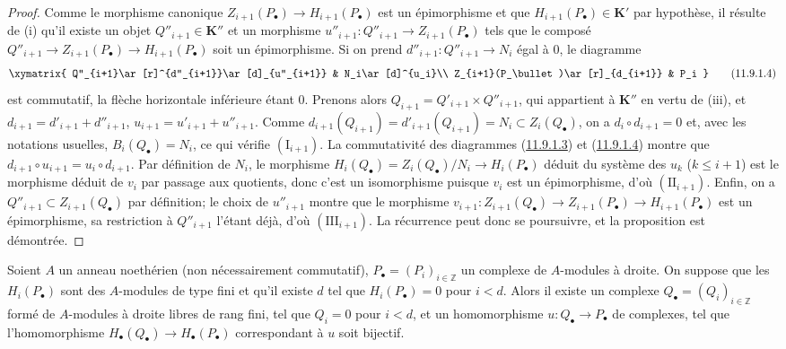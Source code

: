 \begin{proof}
Comme le morphisme canonique $Z_{i+1}(P_\bullet)\to H_{i+1}(P_\bullet)$ est
un épimorphisme et que $H_{i+1}(P_\bullet)\in\boldsymbol{K}'$ par hypothèse, il résulte
de (i) qu'il existe un objet $Q''_{i+1}\in\boldsymbol{K}''$ et un morphisme
$u''_{i+1}:Q''_{i+1}\to Z_{i+1}(P_\bullet)$ tels que le composé
$Q''_{i+1}\to Z_{i+1}(P_\bullet)\to H_{i+1}(P_\bullet)$ soit un
épimorphisme. Si on prend $d''_{i+1}:Q''_{i+1}\to N_i$ égal à $0$, le
diagramme
\[
\xymatrix{
Q''_{i+1}\ar[r]^{d''_{i+1}}\ar[d]_{u''_{i+1}} &
N_i\ar[d]^{u_i}\\
Z_{i+1}(P_\bullet)\ar[r]_{d_{i+1}} & P_i
}
\tag{11.9.1.4}\label{0.11.9.1.4-fr}
\]
est commutatif, la flèche horizontale inférieure étant $0$. Prenons alors $Q_{i+1}=Q'_{i+1}\times Q''_{i+1}$,
qui appartient à $\boldsymbol{K}''$ en vertu de (iii), et
$d_{i+1}=d'_{i+1}+d''_{i+1}$, $u_{i+1}=u'_{i+1}+u''_{i+1}$.
Comme $d_{i+1}(Q_{i+1})=d'_{i+1}(Q_{i+1})=N_i\subset Z_i(Q_\bullet)$, on a
$d_i\circ d_{i+1}=0$ et, avec les notations usuelles,
$B_i(Q_\bullet)=N_i$, ce qui vérifie $(\mathrm I_{i+1})$. La commutativité
des diagrammes (\hyperref[0.11.9.1.3-fr]{11.9.1.3}) et
(\hyperref[0.11.9.1.4-fr]{11.9.1.4}) montre que
$d_{i+1}\circ u_{i+1}=u_i\circ d_{i+1}$. Par définition de $N_i$, le
morphisme
$H_i(Q_\bullet)=Z_i(Q_\bullet)/N_i\to H_i(P_\bullet)$
déduit du système des $u_k$ ($k\leq i+1$) est le morphisme déduit de $v_i$
par passage aux quotients, donc c'est un isomorphisme puisque $v_i$ est un
épimorphisme, d'où $(\mathrm{II}_{i+1})$. Enfin, on a
$Q''_{i+1}\subset Z_{i+1}(Q_\bullet)$ par définition; le choix de
$u''_{i+1}$ montre que le morphisme
$v_{i+1}:Z_{i+1}(Q_\bullet)\to Z_{i+1}(P_\bullet)
\to H_{i+1}(P_\bullet)$
est un épimorphisme, sa restriction à $Q''_{i+1}$ l'étant déjà, d'où
$(\mathrm{III}_{i+1})$. La récurrence peut donc se poursuivre, et la
proposition est démontrée.
\end{proof}

\begin{corollary}[11.9.2]
\label{0.11.9.2-fr}
Soient $A$ un anneau noethérien (non nécessairement commutatif),
$P_\bullet=(P_i)_{i\in\mathbb Z}$ un complexe de $A$-modules à droite. On
suppose que les $H_i(P_\bullet)$ sont des $A$-modules de type fini et qu'il
existe $d$ tel que $H_i(P_\bullet)=0$ pour $i<d$. Alors il existe un complexe
$Q_\bullet=(Q_i)_{i\in\mathbb Z}$ formé de $A$-modules à droite libres de
rang fini, tel que $Q_i=0$ pour $i<d$, et un homomorphisme
$u:Q_\bullet\to P_\bullet$ de complexes, tel que l'homomorphisme
$H_\bullet(Q_\bullet)\to H_\bullet(P_\bullet)$ correspondant à $u$ soit
bijectif.
\end{corollary}

